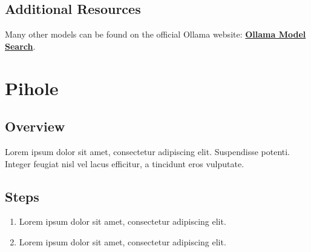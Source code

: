\documentclass[a4paper,12pt]{article}
\begin{document}
\subsection{Additional Resources}
Many other models can be found on the official Ollama website: \href{https://ollama.com/search}{\textbf{\color{blue}Ollama Model Search}}.


\section{Pihole}

\subsection{Overview}
Lorem ipsum dolor sit amet, consectetur adipiscing elit. Suspendisse potenti. Integer feugiat nisl vel lacus efficitur, a tincidunt eros vulputate.

\subsection{Steps}
\begin{enumerate}
    \item Lorem ipsum dolor sit amet, consectetur adipiscing elit.
    \item Lorem ipsum dolor sit amet, consectetur adipiscing elit.
\end{enumerate}
\end{document}
